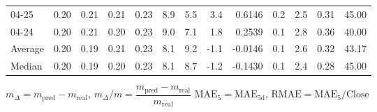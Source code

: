 \begin{threeparttable}
{\begin{tabular}{lrrrrrrrrrrrr}
  04-25 &          0.20 &          0.21 &          0.21 &        0.23 &                 8.9 &                 5.5 &        3.4 &       0.6146 &                 0.2 &              2.5 &            0.31 &                  45.00 \\
  04-24 &          0.20 &          0.21 &          0.20 &        0.23 &                 9.0 &                 7.1 &        1.8 &       0.2539 &                 0.1 &              2.8 &            0.36 &                  40.00 \\
Average &          0.20 &          0.19 &          0.21 &        0.23 &                 8.1 &                 9.2 &       -1.1 &      -0.0146 &                 0.1 &              2.6 &            0.32 &                  43.17 \\
 Median &          0.20 &          0.19 &          0.20 &        0.23 &                 8.1 &                 8.7 &       -1.2 &      -0.1430 &                 0.1 &              2.4 &            0.28 &                  45.00 \\
\bottomrule
\end{tabular}
}
\begin{tablenotes}\footnotesize
\item $m_\Delta=m_{\text{pred}}-m_{\text{real}}$,
$m_\Delta/m=\dfrac{m_{\text{pred}}-m_{\text{real}}}{m_{\text{real}}}$
$\mathrm{MAE}_5=\mathrm{MAE}_{5\text{d}}$,
$\mathrm{RMAE}=\mathrm{MAE}_5/\text{Close}$
\end{tablenotes}
\end{threeparttable}
\endgroup

